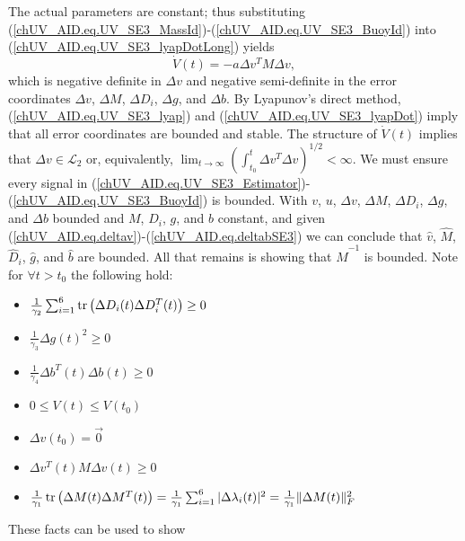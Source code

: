 The actual parameters are constant; thus substituting 
(\ref{chUV_AID.eq.UV_SE3_MassId})-(\ref{chUV_AID.eq.UV_SE3_BuoyId}) into
(\ref{chUV_AID.eq.UV_SE3_lyapDotLong}) yields
%
\begin{equation}\label{chUV_AID.eq.UV_SE3_lyapDot}
\dot{V}(t)=-a\Delta v^T M \Delta v,
\end{equation}
%
\noindent which is negative definite in $\Delta v$ and negative
semi-definite in the error coordinates $\Delta v$, $\Delta M$, $\Delta
D_i$, $\Delta g$, and $\Delta b$.  By Lyapunov's direct method,
(\ref{chUV_AID.eq.UV_SE3_lyap}) and (\ref{chUV_AID.eq.UV_SE3_lyapDot})
imply that all error coordinates are bounded and stable.  The
structure of $\dot{V}(t)$ implies that $\Delta v \in \mathcal{L}_2$
or, equivalently, $\lim_{t\to\infty}\left( \int_{t_0}^t\Delta v^T
  \Delta v\right)^{1/2}<\infty$.  We must ensure every signal in
(\ref{chUV_AID.eq.UV_SE3_Estimator})-(\ref{chUV_AID.eq.UV_SE3_BuoyId})
is bounded.  With $v$, $u$, $\Delta v$, $\Delta M$, $\Delta D_i$,
$\Delta g$, and $\Delta b$ bounded and $M$, $D_i$, $g$, and $b$
constant, and given
(\ref{chUV_AID.eq.deltav})-(\ref{chUV_AID.eq.deltabSE3}) we can
conclude that $\hat{v}$, $\hat{M}$, $\hat{D}_i$, $\hat{g}$, and
$\hat{b}$ are bounded. All that remains is showing that $\hat{M}^{-1}$
is bounded.
%
Note for $\forall t>t_0$ the following hold:
\begin{itemize}
\item 
$\frac{1}{\gamma_2}\sum_{i=1}^6\operatorname{tr}\left(\Delta D_i(t) \Delta
  D_i^T(t)\right)\geq 0$
\item 
$\frac{1}{\gamma_3}\Delta g(t)^2\geq 0$
\item 
$\frac{1}{\gamma_4}\Delta b^T(t) \Delta b(t) \geq 0$
\item 
$0 \leq V(t) \leq V(t_0)$
\item 
$\Delta v(t_0)=\vec{0}$ 
\item
$ \Delta v^T(t) M \Delta v (t)\geq 0$
\item 
$\frac{1}{\gamma_1}\operatorname{tr}\left(\Delta M(t) \Delta M^T(t)\right)=
\frac{1}{\gamma_1}\sum_{i=1}^6|\Delta\lambda_i(t)|^2=\frac{1}{\gamma_1}\|\Delta
M(t)\|_F^2$
\end{itemize}
%
These facts can be used to show
%

